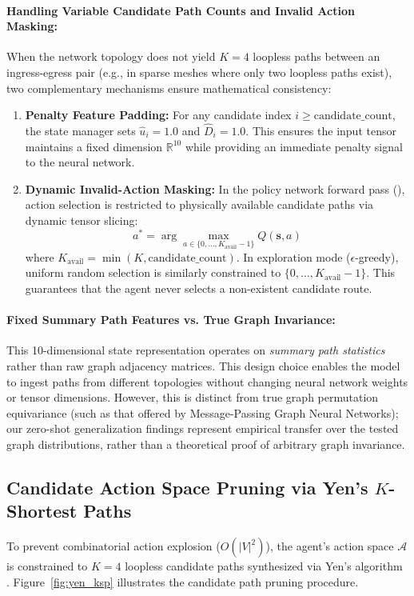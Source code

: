 \documentclass[12pt,a4paper,oneside]{report}
\newcommand{\code}[1]{\relax\ifmmode\text{\small\ttfamily\nolinkurl{#1}}\else{\small\ttfamily\nolinkurl{#1}}\fi}
\begin{document}
\paragraph{Handling Variable Candidate Path Counts and Invalid Action Masking:}
When the network topology does not yield $K=4$ loopless paths between an ingress-egress pair (e.g., in sparse meshes where only two loopless paths exist), two complementary mechanisms ensure mathematical consistency:
\begin{enumerate}
    \item \textbf{Penalty Feature Padding:} For any candidate index $i \ge \text{candidate\_count}$, the state manager sets $\hat{u}_i = 1.0$ and $\hat{D}_i = 1.0$. This ensures the input tensor maintains a fixed dimension $\mathbb{R}^{10}$ while providing an immediate penalty signal to the neural network.
    \item \textbf{Dynamic Invalid-Action Masking:} In the policy network forward pass (\code{agent/dqn_router.py}), action selection is restricted to physically available candidate paths via dynamic tensor slicing:
    \begin{equation}
    a^* = \arg\max_{a \in \{0, \dots, K_{\text{avail}}-1\}} Q(\mathbf{s}, a)
    \end{equation}
    where $K_{\text{avail}} = \min(K, \text{candidate\_count})$. In exploration mode ($\epsilon$-greedy), uniform random selection is similarly constrained to $\{0, \dots, K_{\text{avail}}-1\}$. This guarantees that the agent never selects a non-existent candidate route.
\end{enumerate}

\paragraph{Fixed Summary Path Features vs. True Graph Invariance:}
This 10-dimensional state representation operates on \emph{summary path statistics} rather than raw graph adjacency matrices. This design choice enables the model to ingest paths from different topologies without changing neural network weights or tensor dimensions. However, this is distinct from true graph permutation equivariance (such as that offered by Message-Passing Graph Neural Networks); our zero-shot generalization findings represent empirical transfer over the tested graph distributions, rather than a theoretical proof of arbitrary graph invariance.

\subsection{Candidate Action Space Pruning via Yen's $K$-Shortest Paths}
To prevent combinatorial action explosion ($O(|V|^2)$), the agent's action space $\mathcal{A}$ is constrained to $K = 4$ loopless candidate paths synthesized via Yen's algorithm \cite{yen1971finding}. Figure~\ref{fig:yen_ksp} illustrates the candidate path pruning procedure.
\end{document}
